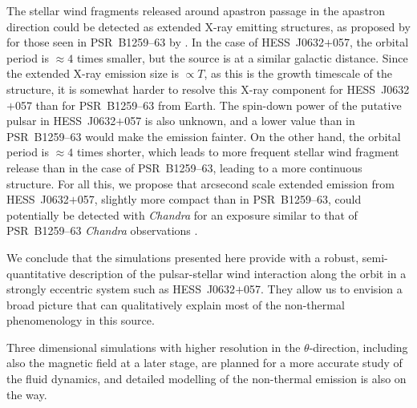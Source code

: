 \documentclass[usenatbib]{mn2e}
\def\psr{{PSR~B1259--63}}
\def\j06{{HESS~J0632$+$057}}
\begin{document}
The stellar wind fragments released around apastron passage in the apastron direction could be detected as extended X-ray emitting structures, 
as proposed by \cite{bb16} for those seen in \psr{} by \cite{phk15}. In the case of \j06, {the orbital period is $\approx 4$ times smaller, but the source is at a similar galactic distance. Since the extended X-ray emission size is $\propto T$, as this is the growth timescale of the structure, it is somewhat harder to resolve this X-ray component for \j06 than for \psr{} from Earth.} The spin-down power of the putative pulsar in \j06{} is also unknown, and a lower value than in \psr{} would make the emission fainter. On the other hand, the orbital period is $\approx 4$ 
times shorter, which leads to more frequent stellar wind fragment release than in the case of \psr{}, leading to a more continuous structure. For all this, 
we propose that arcsecond scale extended emission from \j06, slightly more compact than in \psr, could potentially be detected with {\it Chandra} 
for an exposure similar to that of \psr{} {\it Chandra} observations \citep{phk15}.

We conclude that the simulations presented here provide with a robust, semi-quantitative description of the pulsar-stellar wind interaction along the orbit in a strongly eccentric 
system such as \j06{}. They allow us to envision a broad picture that can qualitatively explain most of the non-thermal phenomenology in this source. 

Three dimensional simulations with higher resolution in the $\theta$-direction, including also the magnetic field at a later stage, are planned for a more accurate study of the 
fluid dynamics, and detailed modelling of the non-thermal emission is also on the way. 


\end{document}
